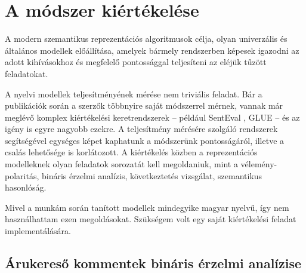 \chapter{A módszer kiértékelése}
\label{ch:eval}

A modern szemantikus reprezentációs algoritmusok célja, olyan univerzális és általános modellek előállítása, amelyek bármely rendszerben képesek igazodni az adott kihívásokhoz és megfelelő pontossággal teljesíteni az eléjük tűzött feladatokat.

A nyelvi modellek teljesítményének mérése nem triviális feladat. Bár a publikációk során a szerzők többnyire saját módszerrel mérnek, vannak már meglévő komplex kiértékelési keretrendszerek – például SentEval \cite{senteval}, GLUE \cite{glue} – és az igény is egyre nagyobb ezekre. A teljesítmény mérésére szolgáló rendszerek segítségével egységes képet kaphatunk a módszerünk pontosságáról, illetve a csalás lehetősége is korlátozott. A kiértékelés közben a reprezentációs modelleknek olyan feladatok sorozatát kell megoldaniuk, mint a vélemény-polaritás, bináris érzelmi analízis, következtetés vizsgálat, szemantikus hasonlóság.

Mivel a munkám során tanított modellek mindegyike magyar nyelvű, így nem használhattam ezen megoldásokat. Szükségem volt egy saját kiértékelési feladat implementálására.

\section{Árukereső kommentek bináris érzelmi analízise}

















